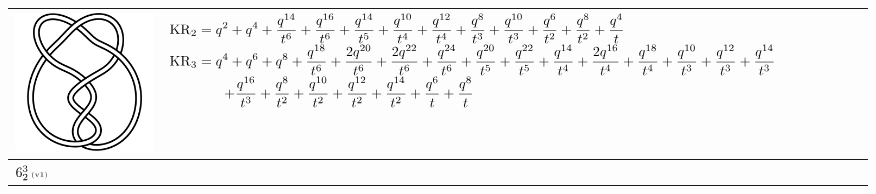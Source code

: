 \documentclass{compositio}
\theoremstyle{definition}
\numberwithin{equation}{section}
\begin{document}
{\begin{longtable}{p{}|p{}}
\includegraphics[scale=0.07,angle=0]{link6_2_2.pdf} 
& 
\newline 
$
\displaystyle{%
\KR_{2} = q^2+q^4+\frac{q^{14}}{t^6}+\frac{q^{16}}{t^6}+\frac{q^{14}}{t^5}+\frac{q^{10}}{t^4}+\frac{q^{12}}{t^4}+\frac{q^8}{t^3}+\frac{q^{10}}{t^3}+\frac{q^6}{t^2}+\frac{q^8}{t^2}+\frac{q^4}{t}
}
$
\newline 
$
\displaystyle{%
\KR_{3} = q^4+q^6+q^8+\frac{q^{18}}{t^6}+\frac{2 q^{20}}{t^6}+\frac{2 q^{22}}{t^6}+\frac{q^{24}}{t^6}+\frac{q^{20}}{t^5}+\frac{q^{22}}{t^5}+\frac{q^{14}}{t^4}+\frac{2 q^{16}}{t^4}+\frac{q^{18}}{t^4}+\frac{q^{10}}{t^3}+\frac{q^{12}}{t^3}+\frac{q^{14}}{t^3}
}
$
\newline
$
\displaystyle{%
\qquad\qquad +\frac{q^{16}}{t^3}+\frac{q^8}{t^2}+\frac{q^{10}}{t^2}+\frac{q^{12}}{t^2}+\frac{q^{14}}{t^2}+\frac{q^6}{t}+\frac{q^8}{t}
}
$
\newline 
\\
\hline
$6_{2}^3\,\text{{\tiny (v1)}}$ 

\end{longtable}}
\end{document}
